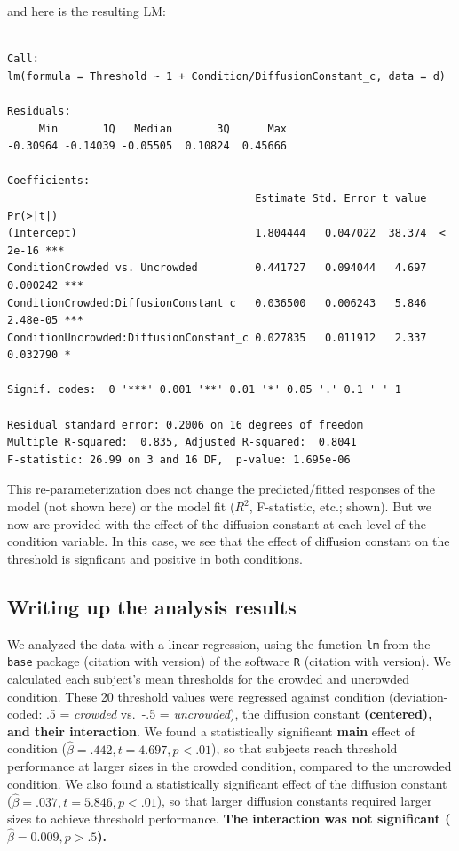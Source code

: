 \documentclass[
]{article}
\begin{document}
\normalsize

and here is the resulting LM:

\footnotesize

\begin{verbatim}

Call:
lm(formula = Threshold ~ 1 + Condition/DiffusionConstant_c, data = d)

Residuals:
     Min       1Q   Median       3Q      Max 
-0.30964 -0.14039 -0.05505  0.10824  0.45666 

Coefficients:
                                       Estimate Std. Error t value Pr(>|t|)    
(Intercept)                            1.804444   0.047022  38.374  < 2e-16 ***
ConditionCrowded vs. Uncrowded         0.441727   0.094044   4.697 0.000242 ***
ConditionCrowded:DiffusionConstant_c   0.036500   0.006243   5.846 2.48e-05 ***
ConditionUncrowded:DiffusionConstant_c 0.027835   0.011912   2.337 0.032790 *  
---
Signif. codes:  0 '***' 0.001 '**' 0.01 '*' 0.05 '.' 0.1 ' ' 1

Residual standard error: 0.2006 on 16 degrees of freedom
Multiple R-squared:  0.835, Adjusted R-squared:  0.8041 
F-statistic: 26.99 on 3 and 16 DF,  p-value: 1.695e-06
\end{verbatim}

\normalsize

This re-parameterization does not change the predicted/fitted responses
of the model (not shown here) or the model fit (\(R^2\), F-statistic,
etc.; shown). But we now are provided with the effect of the diffusion
constant at each level of the condition variable. In this case, we see
that the effect of diffusion constant on the threshold is signficant and
positive in both conditions.

\hypertarget{writing-up-the-analysis-results}{%
\subsection{Writing up the analysis
results}\label{writing-up-the-analysis-results}}

\color{lightgray}

We analyzed the data with a linear regression, using the function
\texttt{lm} from the \texttt{base} package (citation with version) of
the software \texttt{R} (citation with version). We calculated each
subject's mean thresholds for the crowded and uncrowded condition. These
20 threshold values were regressed against condition (deviation-coded:
.5 = \emph{crowded} vs.~-.5 = \emph{uncrowded}), the diffusion constant
\textbf{(centered), and their interaction}. We found a statistically
significant \textbf{main} effect of condition
(\(\widehat{\beta}=.442, t=4.697, p<.01\)), so that subjects reach
threshold performance at larger sizes in the crowded condition, compared
to the uncrowded condition. We also found a statistically significant
effect of the diffusion constant
(\(\widehat{\beta}=.037, t=5.846, p<.01\)), so that larger diffusion
constants required larger sizes to achieve threshold performance.
\textbf{The interaction was not significant
(\(\widehat{\beta} = 0.009, p > .5\)).} \color{black}
\end{document}
